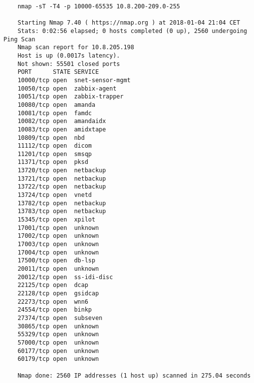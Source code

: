 \begin{lstlisting}
	nmap -sT -T4 -p 10000-65535 10.8.200-209.0-255
	
	Starting Nmap 7.40 ( https://nmap.org ) at 2018-01-04 21:04 CET
	Stats: 0:02:56 elapsed; 0 hosts completed (0 up), 2560 undergoing Ping Scan
	Nmap scan report for 10.8.205.198
	Host is up (0.0017s latency).
	Not shown: 55501 closed ports
	PORT      STATE SERVICE
	10000/tcp open  snet-sensor-mgmt
	10050/tcp open  zabbix-agent
	10051/tcp open  zabbix-trapper
	10080/tcp open  amanda
	10081/tcp open  famdc
	10082/tcp open  amandaidx
	10083/tcp open  amidxtape
	10809/tcp open  nbd
	11112/tcp open  dicom
	11201/tcp open  smsqp
	11371/tcp open  pksd
	13720/tcp open  netbackup
	13721/tcp open  netbackup
	13722/tcp open  netbackup
	13724/tcp open  vnetd
	13782/tcp open  netbackup
	13783/tcp open  netbackup
	15345/tcp open  xpilot
	17001/tcp open  unknown
	17002/tcp open  unknown
	17003/tcp open  unknown
	17004/tcp open  unknown
	17500/tcp open  db-lsp
	20011/tcp open  unknown
	20012/tcp open  ss-idi-disc
	22125/tcp open  dcap
	22128/tcp open  gsidcap
	22273/tcp open  wnn6
	24554/tcp open  binkp
	27374/tcp open  subseven
	30865/tcp open  unknown
	55329/tcp open  unknown
	57000/tcp open  unknown
	60177/tcp open  unknown
	60179/tcp open  unknown
	
	Nmap done: 2560 IP addresses (1 host up) scanned in 275.04 seconds
	
\end{lstlisting}